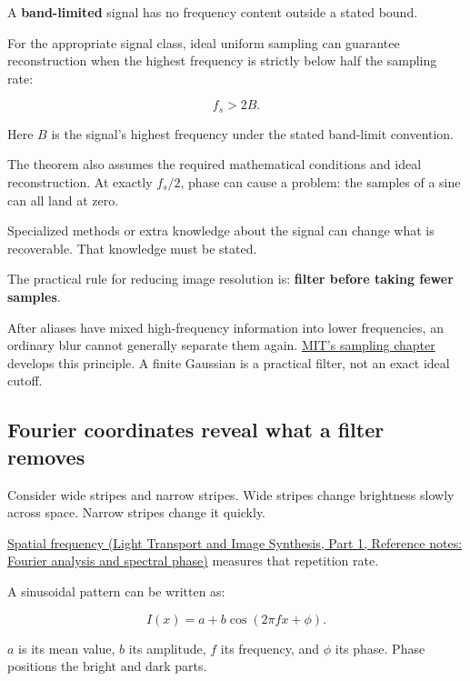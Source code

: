 A \textbf{band-limited} signal has no frequency content outside a stated bound.

For the appropriate signal class, ideal uniform sampling can guarantee reconstruction when the highest frequency is strictly below half the sampling rate:

\[
f_s>2B.
\]

Here \(B\) is the signal's highest frequency under the stated band-limit convention.

The theorem also assumes the required mathematical conditions and ideal reconstruction. At exactly \(f_s/2\), phase can cause a problem: the samples of a sine can all land at zero.

Specialized methods or extra knowledge about the signal can change what is recoverable. That knowledge must be stated.

The practical rule for reducing image resolution is: \textbf{filter before taking fewer samples}.

After aliases have mixed high-frequency information into lower frequencies, an ordinary blur cannot generally separate them again. \href{https://visionbook.mit.edu/sampling_and_aliasing.html}{MIT's sampling chapter} develops this principle. A finite Gaussian is a practical filter, not an exact ideal cutoff.

\subsection{Fourier coordinates reveal what a filter removes}\label{04-visual-computing-ii-ch043-fourier-coordinates-reveal-what-a-filter-removes}

\hypertarget{04-visual-computing-ii-ch043-fourier-coordinates-reveal-what-a-filter-removes}{}

Consider wide stripes and narrow stripes. Wide stripes change brightness slowly across space. Narrow stripes change it quickly.

\href{../04-Light-Transport-and-Image-Synthesis-P01/main.pdf\#nameddest=appendix-b60686ba06a1}{Spatial frequency (Light Transport and Image Synthesis, Part 1, Reference notes: Fourier analysis and spectral phase)} measures that repetition rate.

A sinusoidal pattern can be written as:

\[
I(x)=a+b\cos(2\pi fx+\phi).
\]

\(a\) is its mean value, \(b\) its amplitude, \(f\) its frequency, and \(\phi\) its phase. Phase positions the bright and dark parts.

